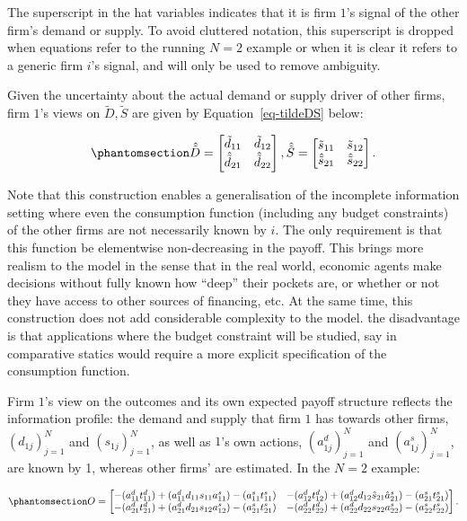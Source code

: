 \documentclass[
]{article}
\theoremstyle{definition}
\theoremstyle{plain}
\theoremstyle{remark}
\begin{document}
The superscript in the hat variables indicates that it is firm \(1\)'s
signal of the other firm's demand or supply. To avoid cluttered
notation, this superscript is dropped when equations refer to the
running \(N=2\) example or when it is clear it refers to a generic firm
\(i\)'s signal, and will only be used to remove ambiguity.

Given the uncertainty about the actual demand or supply driver of other
firms, firm \(1\)'s views on \(\tilde{D}, \tilde{S}\) are given by
Equation~\ref{eq-tildeDS} below:

\begin{equation}\phantomsection\label{eq-tildeDS}{
\hat{\tilde{D}} = 
\begin{bmatrix}
\tilde{d}_{11} & \tilde{d}_{12} \\
\hat{\tilde{d}}_{21} & \hat{\tilde{d}}_{22}
\end{bmatrix}
,
\hat{\tilde{S}} = 
\begin{bmatrix}
\tilde{s}_{11} & \tilde{s}_{12} \\
\hat{\tilde{s}}_{21} & \hat{\tilde{s}}_{22}
\end{bmatrix}.
}\end{equation}

Note that this construction enables a generalisation of the incomplete
information setting where even the consumption function (including any
budget constraints) of the other firms are not necessarily known by
\(i\). The only requirement is that this function be elementwise
non-decreasing in the payoff. This brings more realism to the model in
the sense that in the real world, economic agents make decisions without
fully known how ``deep'' their pockets are, or whether or not they have
access to other sources of financing, etc. At the same time, this
construction does not add considerable complexity to the model. the
disadvantage is that applications where the budget constraint will be
studied, say in comparative statics would require a more explicit
specification of the consumption function.

Firm \(1\)'s view on the outcomes and its own expected payoff structure
reflects the information profile: the demand and supply that firm \(1\)
has towards other firms, \((d_{1j})_{j=1}^N\) and \((s_{1j})_{j=1}^N\),
as well as \(1\)'s own actions, \((a_{1j}^d)_{j=1}^N\) and
\((a_{1j}^s)_{j=1}^N\), are known by 1, whereas other firms' are
estimated. In the \(N=2\) example:

\begin{equation}\phantomsection\label{eq-iioutcomes}{
O = 
\begin{bmatrix}
-(a_{11}^d t_{11}^d) + (a_{11}^d d_{11} s_{11} a_{11}^s) - (a_{11}^s t_{11}^s) & -(a_{12}^d t_{12}^d) + (a_{12}^d d_{12} \hat{s}_{21} \hat{a}_{21}^s) - (a_{21}^s t_{21}^s)\\
-(a_{21}^d t_{21}^d) + (a_{21}^d d_{21} s_{12} a_{12}^s) - (a_{21}^s t_{21}^s) & -(a_{22}^d t_{22}^d) + (a_{22}^d d_{22} s_{22} a_{22}^s) - (a_{22}^s t_{22}^s)
\end{bmatrix}.
}\end{equation}
\end{document}
